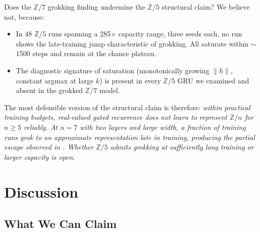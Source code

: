 \documentclass[11pt]{article}
\theoremstyle{definition}
\newcommand{\Z}{\mathbb{Z}}
\begin{document}
Does the $\Z/7$ grokking finding undermine the $\Z/5$ structural
claim? We believe not, because:

\begin{itemize}[itemsep=2pt]
\item In 48 $\Z/5$ runs spanning a 285$\times$ capacity range, three
seeds each, no run shows the late-training jump characteristic of
grokking. All saturate within $\sim$1500 steps and remain at the
chance plateau.
\item The diagnostic signature of saturation (monotonically growing
$\|h\|$, constant argmax at large $k$) is present in every $\Z/5$
GRU we examined and absent in the grokked $\Z/7$ model.
\end{itemize}

The most defensible version of the structural claim is therefore:
\emph{within practical training budgets, real-valued gated
recurrence does not learn to represent $\Z/n$ for $n \geq 5$
reliably. At $n = 7$ with two layers and large width, a fraction of
training runs grok to an approximate representation late in training,
producing the partial escape observed in .
Whether $\Z/5$ admits grokking at sufficiently long training or
larger capacity is open}.


\section{Discussion}
\label{sec:discussion}

\subsection{What We Can Claim}
\end{document}
